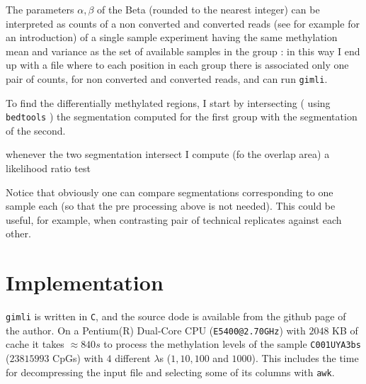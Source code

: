 \documentclass[12pt]{amsart}
\newcommand{\gimli}{\texttt{gimli}}
\begin{document}
The parameters $\alpha,\beta$ of the Beta (rounded to the nearest integer) 
can be interpreted as counts of 
a non converted and converted reads (see for example \cite{methyldiff} for an
introduction) of a single sample experiment having the same methylation 
mean and variance as  the set of available samples in the group : in this
way I end up with a file where to each position in each group there is associated only one
pair of counts, for non converted and converted reads, and can run \gimli{}.

To find the differentially methylated regions, I start by intersecting
( using \texttt{bedtools}\cite{bedtools} ) the segmentation computed for 
the first group with the segmentation of the second. 

whenever the two segmentation intersect I compute (fo the overlap area)
a likelihood ratio test

Notice that obviously one can compare segmentations corresponding to one sample
each (so that the pre processing above is not needed). 
This could be useful, for example, 
when contrasting pair of technical replicates 
against each other.

\section{Implementation}

\gimli{} is written in \texttt{C}, and the source
dode is available from the github page of the author. 
On a Pentium(R) Dual-Core  CPU (\texttt{E5400@2.70GHz})
with $2048$ KB of cache it takes $\approx 840s$ to process the 
methylation levels of the sample \texttt{C001UYA3bs} ($23815993$ CpGs) 
with $4$ different $\lambda$s ($1,10,100$ and $1000$).
This includes the time for decompressing the input file and selecting some of its columns
with \texttt{awk}.



\end{document}
